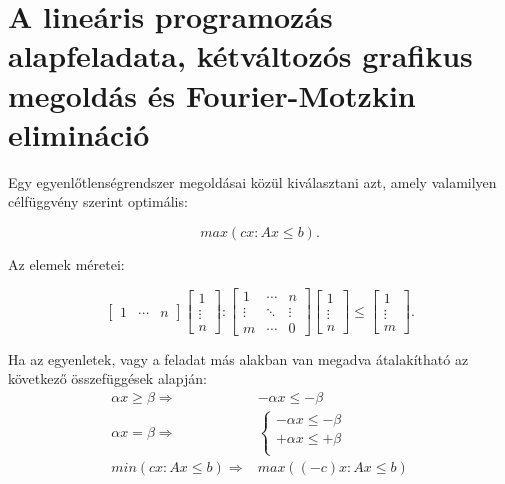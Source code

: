 \skiptooddpage
\section[A lineáris programozás alapfeladata]{A lineáris programozás
  alapfeladata, kétváltozós grafikus megoldás és Fourier-Motzkin elimináció}

Egy egyenlőtlenségrendszer megoldásai közül kiválasztani azt, amely valamilyen
célfüggvény szerint optimális:

\begin{displaymath}
	max(cx: Ax \leq b).
\end{displaymath}

Az elemek méretei:

\begin{displaymath}
	\begin{bmatrix} 1 &  \cdots &  n \end{bmatrix}
	\begin{bmatrix} 1 \\ \vdots \\  n \end{bmatrix}
	:
	\begin{bmatrix} 1 & \cdots & n \\ \vdots & \ddots & \vdots \\ m  & \cdots & 0 \end{bmatrix}
	\begin{bmatrix} 1 \\ \vdots \\  n \end{bmatrix}
	\leq
	\begin{bmatrix} 1 \\ \vdots \\  m \end{bmatrix}.
\end{displaymath}

Ha az egyenletek, vagy a feladat más alakban van megadva átalakítható az
következő összefüggések alapján:
\begin{align*}
	\alpha x \geq \beta  \Rightarrow & -\alpha x \leq -\beta \\
	\alpha x  =    \beta \Rightarrow & \begin{cases}
		                                   -\alpha x \leq-\beta \\
		                                   +\alpha x \leq+\beta \\
	                                   \end{cases}  \\
	min(cx:Ax \leq b)	 \Rightarrow   & max((-c)x:Ax \leq b)
\end{align*}

